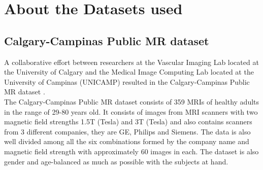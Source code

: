 \chapter{About the Datasets used}
\ifpdf
    \graphicspath{{Chapter3/Chapter3Figs/PNG/}{Chapter3/Chapter3Figs/PDF/}{Chapter3/Chapter3Figs/}}
\else
    \graphicspath{{Chapter3/Chapter3Figs/EPS/}{Chapter3/Chapter3Figs/}}
\fi

\section{Calgary-Campinas Public MR dataset}\label{sec:3_1}


A collaborative effort between researchers at the Vascular Imaging Lab located at the University of Calgary and the Medical Image Computing Lab located at the University of Campinas (UNICAMP) resulted in the Calgary-Campinas Public MR dataset \cite{SOUZA2018482}.\\

The Calgary-Campinas Public MR dataset consists of 359 MRIs of healthy adults in the range of 29-80 years old. It consists of images from MRI scanners with two magnetic field strengths 1.5T (Tesla) and 3T (Tesla) and also contains scanners from 3 different companies, they are GE, Philips and Siemens. The data is also well divided among all the six combinations formed by the company name and magnetic field strength with approximately 60 images in each. The dataset is also gender and age-balanced as much as possible with the subjects at hand.\\

